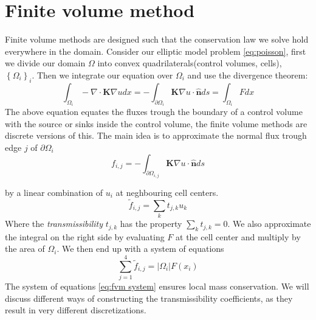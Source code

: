 \documentclass[../Main/main.tex]{subfiles}
\begin{document}
	\chapter{Finite volume method}
	\graphicspath{{../Finite volume method/figs/}}
	Finite volume methods are designed such that the conservation law we solve hold everywhere in the domain. Consider our elliptic model problem \eqref{eq:poisson}, first we divide our domain $\Omega$ into convex quadrilaterals(control volumes, cells), $\left \{ \Omega_i \right \}_i$. Then we integrate our equation over $\Omega_i$ and use the divergence theorem:
\begin{equation}\label{eq:fvm1}
	\int_{\Omega_i} -\nabla \cdot \pmb{K} \nabla u dx = -\int_{\partial \Omega_i} \pmb{K}\nabla u \cdot \pmb{\hat{n}} ds = \int_{\Omega_i} F dx
\end{equation}
The above equation equates the fluxes trough the boundary of a control volume with the source or sinks inside the control volume, the finite volume methods are discrete versions of this. The main idea is to approximate the normal flux trough edge $j$ of $\partial \Omega_i$
\begin{equation}
	f_{i,j} =-\int_{\partial \Omega_{i,j}} \pmb{K}\nabla u \cdot \pmb{\hat{n}} ds
\end{equation}

by a linear combination of $u_i$ at neghbouring cell centers. 
\begin{equation}
	\tilde{f}_{i,j} = \sum_{k}t_{j,k}u_k
\end{equation}
Where the \emph{transmissibility } $t_{j,k}$ has the property $\sum_k t_{j,k} = 0$. 
We also approximate the integral on the right side by evaluating $F$ at the cell center and multiply by the area of $\Omega_i$. We then end up with a system of equations
\begin{equation}\label{eq:fvm system}
	\sum_{j=1}^4 \tilde{f}_{i,j} = |\Omega_i|F(x_i)
\end{equation}
The system of equations \eqref{eq:fvm system} ensures local mass conservation. We will discuss different ways of constructing the transmissibility coefficients, as they result in very different discretizations.
\end{document}
